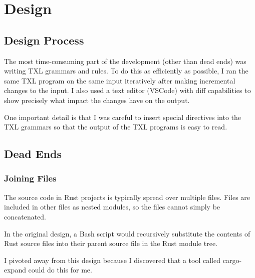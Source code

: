 \documentclass[11pt]{article}
\begin{document}




\section{Design}

\subsection{Design Process}
The most time-consuming part of the development (other than dead ends) was writing TXL grammars and rules.
To do this as efficiently as possible, I ran the same TXL program on the same input iteratively after making incremental changes to the input.
I also used a text editor (VSCode) with diff capabilities to show precisely what impact the changes have on the output.

One important detail is that I was careful to insert special directives into the TXL grammars so that the output of the TXL programs is easy to read.

\subsection{Dead Ends}

\subsubsection{Joining Files}
The source code in Rust projects is typically spread over multiple files.
Files are included in other files as nested modules, so the files cannot simply be concatenated.

In the original design, a Bash script would recursively substitute the contents of Rust source files into their parent source file in the Rust module tree.

I pivoted away from this design because I discovered that a tool called cargo-expand could do this for me.
\end{document}
